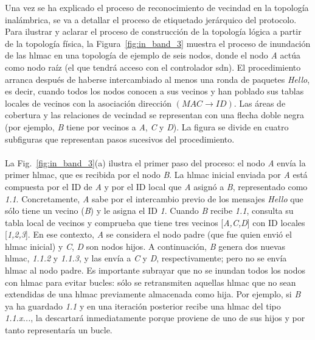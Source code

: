 Una vez se ha explicado el proceso de reconocimiento de vecindad en la topología inalámbrica, se va a detallar el proceso de etiquetado jerárquico del protocolo. Para ilustrar y aclarar el proceso de construcción de la topología lógica a partir de la topología física, la Figura~\ref{fig:in_band_3} muestra el proceso de inundación de las \gls{hlmac} en una topología de ejemplo de seis nodos, donde el nodo \textit{A} actúa como nodo raíz (el que tendrá acceso con el controlador \gls{sdn}). El procedimiento arranca después de haberse intercambiado al menos una ronda de paquetes \textit{Hello}, es decir, cuando todos los nodos conocen a sus vecinos y han poblado sus tablas locales de vecinos con la asociación dirección \((MAC \rightarrow ID)\). Las áreas de cobertura y las relaciones de vecindad se representan con una flecha doble negra (por ejemplo, \textit{B} tiene por vecinos a \textit{A}, \textit{C} y \textit{D}). La figura se divide en cuatro subfiguras que representan pasos sucesivos del procedimiento.\\
\\
La Fig.~\ref{fig:in_band_3}(a) ilustra el primer paso del proceso: el nodo \textit{A} envía la primer \gls{hlmac}, que es recibida por el nodo \textit{B}. La \gls{hlmac} inicial enviada por \textit{A} está compuesta por el ID de \textit{A} y por el ID local que \textit{A} asignó a \textit{B}, representado como \textit{1.1}. Concretamente, \textit{A} sabe por el intercambio previo de los mensajes \textit{Hello} que sólo tiene un vecino (\textit{B}) y le asigna el ID \textit{1}. Cuando \textit{B} recibe \textit{1.1}, consulta su tabla local de vecinos y comprueba que tiene tres vecinos [\textit{A,C,D}] con ID locales [\textit{1,2,3}]. En ese contexto, \textit{A} se considera el nodo padre (que fue quien envió el \gls{hlmac} inicial) y \textit{C}, \textit{D} son nodos hijos. A continuación, \textit{B} genera dos nuevas \gls{hlmac}, \textit{1.1.2} y \textit{1.1.3}, y las envía a \textit{C} y \textit{D}, respectivamente; pero no se envía \gls{hlmac} al nodo padre. Es importante subrayar que no se inundan todos los nodos con \gls{hlmac} para evitar bucles: sólo se retransmiten aquellas \gls{hlmac} que no sean extendidas de una \gls{hlmac} previamente almacenada como hija. Por ejemplo, si \textit{B} ya ha guardado \textit{1.1} y en una iteración posterior recibe una \gls{hlmac} del tipo \textit{1.1.x...}, la descartará inmediatamente porque proviene de uno de sus hijos y por tanto representaría un bucle.\\
\\

